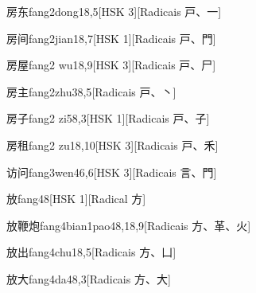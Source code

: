 \begin{entry}{房东}{fang2dong1}{8,5}[HSK 3][Radicais ⼾、⼀]
\end{entry}

\begin{entry}{房间}{fang2jian1}{8,7}[HSK 1][Radicais ⼾、⾨]
\end{entry}

\begin{entry}{房屋}{fang2 wu1}{8,9}[HSK 3][Radicais ⼾、⼫]
\end{entry}

\begin{entry}{房主}{fang2zhu3}{8,5}[Radicais ⼾、⼂]
\end{entry}

\begin{entry}{房子}{fang2 zi5}{8,3}[HSK 1][Radicais ⼾、⼦]
\end{entry}

\begin{entry}{房租}{fang2 zu1}{8,10}[HSK 3][Radicais ⼾、⽲]
\end{entry}

\begin{entry}{访问}{fang3wen4}{6,6}[HSK 3][Radicais ⾔、⾨]
\end{entry}

\begin{entry}{放}{fang4}{8}[HSK 1][Radical ⽅]
\end{entry}

\begin{entry}{放鞭炮}{fang4bian1pao4}{8,18,9}[Radicais ⽅、⾰、⽕]
\end{entry}

\begin{entry}{放出}{fang4chu1}{8,5}[Radicais ⽅、⼐]
\end{entry}

\begin{entry}{放大}{fang4da4}{8,3}[Radicais ⽅、⼤]
\end{entry}

